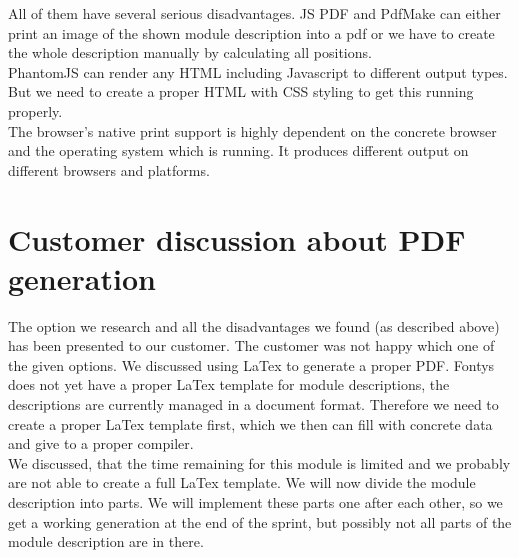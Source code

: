 \documentclass[11pt]{meetingmins}
\begin{document}
All of them have several serious disadvantages.
JS PDF and PdfMake can either print an image of the shown module description into a pdf or we have to create the whole description manually by calculating all positions.
~\\
PhantomJS can render any HTML including Javascript to different output types. But we need to create a proper HTML with CSS styling to get this running properly. 
~\\
The browser's native print support is highly dependent on the concrete browser and the operating system which is running. It produces different output on different browsers and platforms.

\section{Customer discussion about PDF generation}
The option we research and all the disadvantages we found (as described above) has been presented to our customer.
The customer was not happy which one of the given options.
We discussed using LaTex to generate a proper PDF. 
Fontys does not yet have a proper LaTex template for module descriptions, the descriptions are currently managed in a document format.
Therefore we need to create a proper LaTex template first, which we then can fill with concrete data and give to a proper compiler.
~\\
We discussed, that the time remaining for this module is limited and we probably are not able to create a full LaTex template. We will now divide the module description into parts.
We will implement these parts one after each other, so we get a working generation at the end of the sprint, but possibly not all parts of the module description are in there. 
\end{document}
